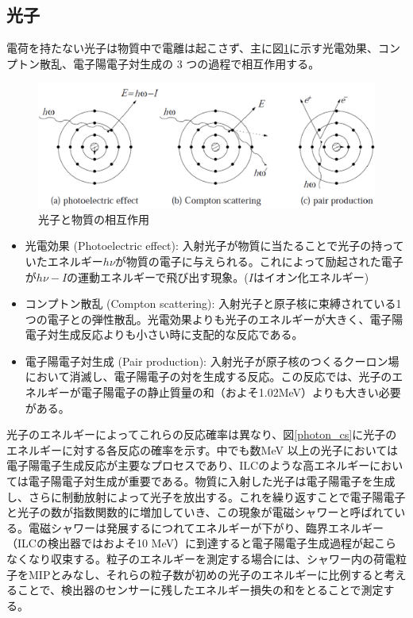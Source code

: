 \subsection{光子}
電荷を持たない光子は物質中で電離は起こさず、主に図\ref{photon}に示す光電効果、コンプトン散乱、電子陽電子対生成の 3 つの過程で相互作用する。
\begin{figure}[H]
	\begin{center}
 \includegraphics[keepaspectratio, scale =0.2]
 	{Figure/Siwecal/photon.png}
 		\caption{光子と物質の相互作用}
 		\label{photon}
	\end{center}
 \end{figure}
\begin{itemize}
 \item 光電効果 (Photoelectric effect): 入射光子が物質に当たることで光子の持っていたエネルギー$h\nu$が物質の電子に与えられる。これによって励起された電子が$h\nu - I$の運動エネルギーで飛び出す現象。($I$はイオン化エネルギー)
 \item コンプトン散乱 (Compton scattering): 入射光子と原子核に束縛されている1つの電子との弾性散乱。光電効果よりも光子のエネルギーが大きく、電子陽電子対生成反応よりも小さい時に支配的な反応である。
 \item 電子陽電子対生成 (Pair production): 入射光子が原子核のつくるクーロン場において消滅し、電子陽電子の対を生成する反応。この反応では、光子のエネルギーが電子陽電子の静止質量の和（およそ1.02MeV）よりも大きい必要がある。
\end{itemize} 
 光子のエネルギーによってこれらの反応確率は異なり、図\ref{photon_cs}に光子のエネルギーに対する各反応の確率を示す。中でも数MeV 以上の光子においては電子陽電子生成反応が主要なプロセスであり、ILCのような高エネルギーにおいては電子陽電子対生成が重要である。物質に入射した光子は電子陽電子を生成し、さらに制動放射によって光子を放出する。これを繰り返すことで電子陽電子と光子の数が指数関数的に増加していき、この現象が電磁シャワーと呼ばれている。電磁シャワーは発展するにつれてエネルギーが下がり、臨界エネルギー（ILCの検出器ではおよそ10 MeV）に到達すると電子陽電子生成過程が起こらなくなり収束する。粒子のエネルギーを測定する場合には、シャワー内の荷電粒子をMIPとみなし、それらの粒子数が初めの光子のエネルギーに比例すると考えることで、検出器のセンサーに残したエネルギー損失の和をとることで測定する。\\
